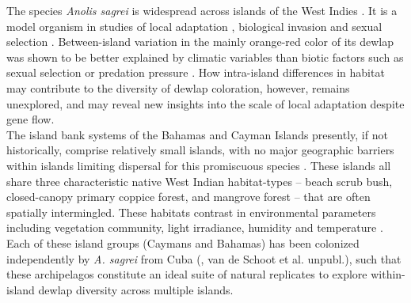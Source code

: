 The species \textit{Anolis sagrei} is widespread across islands of the West Indies \citep{Reynolds2020}. It is a model organism in studies of local adaptation \citep{Losos1994, Losos1997a, Losos2001, Kolbe2012}, biological invasion \citep{Kolbe2008} and sexual selection \citep{Tokarz2002, Tokarz2005, Tokarz2006, Driessens2014, Steffen2014, Driessens2015}. Between-island variation in the mainly orange-red color of its dewlap was shown to be better explained by climatic variables \citep{Driessens2017} than biotic factors such as sexual selection or predation pressure \citep{Vanhooydonck2009, Baeckens2018}. How intra-island differences in habitat may contribute to the diversity of dewlap coloration, however, remains unexplored, and may reveal new insights into the scale of local adaptation despite gene flow.\\

The island bank systems of the Bahamas and Cayman Islands presently, if not historically, comprise relatively small islands, with no major geographic barriers within islands limiting dispersal for this promiscuous species \citep{Kamath2018}. These islands all share three characteristic native West Indian habitat-types -- beach scrub bush, closed-canopy primary coppice forest, and mangrove forest -- that are often spatially intermingled. These habitats contrast in environmental parameters including vegetation community, light irradiance, humidity and temperature \citep{Howard1950, Schoener1968}. Each of these island groups (Caymans and Bahamas) has been colonized independently by \textit{A. sagrei} from Cuba (\citealt{Driessens2017, Reynolds2020}, van de Schoot et al. unpubl.), such that these archipelagos constitute an ideal suite of natural replicates to explore within-island dewlap diversity across multiple islands.\\



